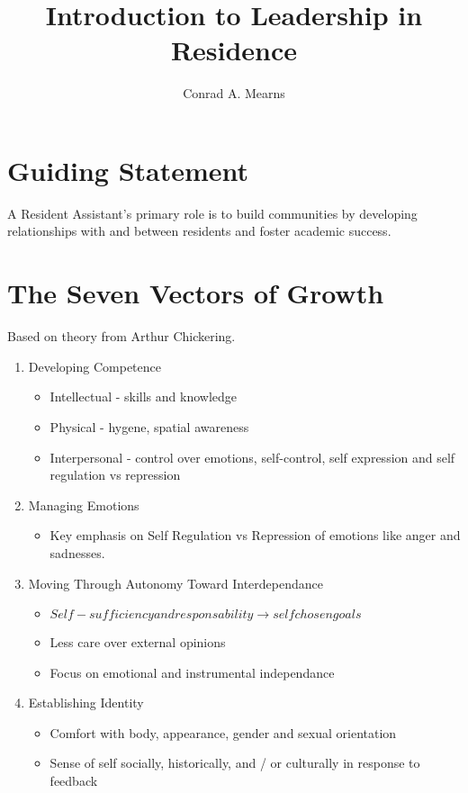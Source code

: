 \documentclass{article}
\title{Introduction to Leadership in Residence}
\author{Conrad A. Mearns}
\begin{document}
\maketitle

\section{Guiding Statement}
A Resident Assistant's primary role is to build communities by developing relationships with and between residents and foster academic success.

\section{The Seven Vectors of Growth}
Based on theory from Arthur Chickering.
\begin{enumerate}
  \item Developing Competence
    \begin{itemize}
      \item Intellectual - skills and knowledge
      \item Physical - hygene, spatial awareness
      \item Interpersonal - control over emotions, self-control, self expression and self regulation vs repression
    \end{itemize}
  \item Managing Emotions
    \begin{itemize}
      \item Key emphasis on Self Regulation vs Repression of emotions like anger and sadnesses.
    \end{itemize}
  \item Moving Through Autonomy Toward Interdependance
    \begin{itemize}
      \item $Self-sufficiency and responsability \to self chosen goals$
      \item Less care over external opinions
      \item Focus on emotional and instrumental independance
    \end{itemize}
  \item Establishing Identity
    \begin{itemize}
      \item Comfort with body, appearance, gender and sexual orientation
      \item Sense of self socially, historically, and / or culturally in response to feedback

\end{itemize}
\end{enumerate}
\end{document}
